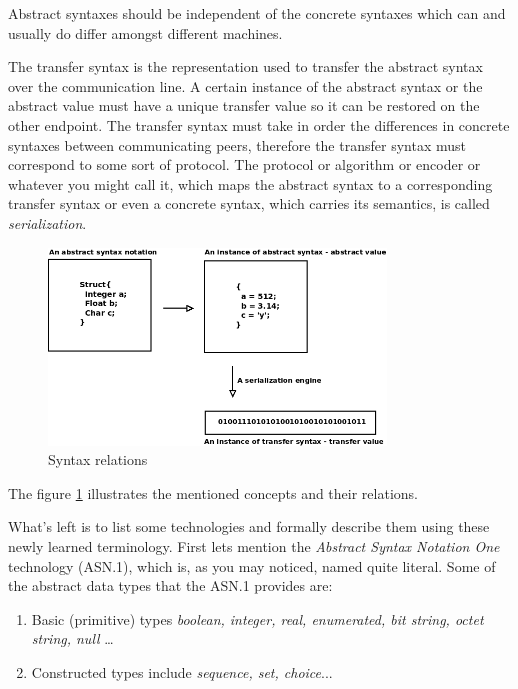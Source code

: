\documentclass[times, utf8, diplomski]{fer}
\begin{document}
Abstract syntaxes should be independent of the concrete syntaxes which can and 
usually do differ amongst different machines.

The transfer syntax is the representation used to transfer the abstract syntax 
over the communication line. A certain instance of the abstract syntax or the 
abstract value must have a unique transfer value so it can be restored on the 
other endpoint. The transfer syntax must take in order the differences in concrete
syntaxes between communicating peers, therefore the transfer syntax must correspond
to some sort of protocol. The protocol or algorithm or encoder or whatever you 
might call it, which maps the abstract syntax to a corresponding transfer syntax 
or even a concrete syntax, which carries its semantics, is called 
\emph{serialization}.

\begin{figure}[htb]
\begin{center}
\leavevmode
\includegraphics[width=0.8\textwidth]{syntax_relations}
\end{center}
\caption{Syntax relations}
\label{fig:syntax_relations}
\end{figure}

The figure \ref{fig:syntax_relations} illustrates the mentioned concepts and 
their relations. 

What's left is to list some technologies and formally describe them using these 
newly learned terminology.
First lets mention the \emph{Abstract Syntax Notation One} technology (ASN.1), 
which is, as you may noticed, named quite literal. Some of the abstract data 
types that the ASN.1 provides are:
\begin{enumerate}
	\item Basic (primitive) types \emph{boolean, integer, real, enumerated, bit string, 
	octet string, null} \ldots
	\item Constructed types include \emph{sequence, set, choice}...
\end{enumerate}
\end{document}
